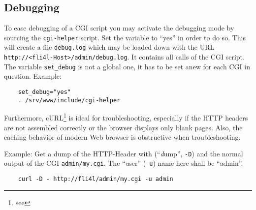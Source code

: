 \subsection{Debugging}

To ease debugging of a CGI script you may activate the debugging mode
by sourcing the \texttt{cgi-helper} script. Set the variable 
to ``yes'' in order to do so. This will create a file \texttt{debug.log}
which may be loaded down with the URL \texttt{http://<fli4l-Host>/admin/debug.log}.
It contains all calls of the CGI script. The variable \texttt{set\_debug} is not a
global one, it has to be set anew for each CGI in question. Example:

\begin{example}
\begin{verbatim}
    set_debug="yes"
    . /srv/www/include/cgi-helper
\end{verbatim}
\end{example}

Furthermore, cURL\footnote{see } is
ideal for troubleshooting, especially if the HTTP headers
are not assembled correctly or the browser displays only blank pages.
Also, the caching behavior of modern Web browser is obstructive when troubleshooting.

Example: Get a dump of the HTTP-Header with ("`\emph{d}ump"',
\texttt{-D}) and the normal output of the CGI \texttt{admin/my.cgi}.
The ``\emph{u}ser'' (\texttt{-u}) name here shall be ``admin''.

\begin{example}
\begin{verbatim}
    curl -D - http://fli4l/admin/my.cgi -u admin
\end{verbatim}
\end{example}
